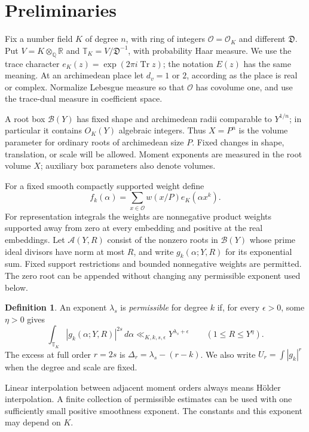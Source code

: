\documentclass[11pt]{amsart}
\theoremstyle{definition}
\newtheorem{definition}[theorem]{Definition}
\numberwithin{equation}{section}
\begin{document}
\section{Preliminaries}
\label{sec:preliminaries}
Fix a number field $K$ of degree $n$, with ring of integers
$\mathcal O=\mathcal O_K$ and different $\mathfrak D$.
Put $V=K\otimes_{\mathbb Q}\mathbb R$ and
$\mathbb T_K=V/\mathfrak D^{-1}$, with probability Haar measure.
We use the trace character $e_K(z)=\exp(2\pi i\operatorname{Tr}z)$;
the notation $E(z)$ has the same meaning. At an archimedean place
let $d_v=1$ or $2$, according as the place is real or complex.
Normalize Lebesgue measure so that $\mathcal O$ has covolume one,
and use the trace-dual measure in coefficient space.

A root box $\mathcal B(Y)$ has fixed shape and archimedean radii
comparable to $Y^{1/n}$; in particular it contains $O_K(Y)$
algebraic integers. Thus $X=P^n$ is the volume parameter for
ordinary roots of archimedean size $P$. Fixed changes in shape,
translation, or scale will be allowed. Moment exponents are measured
in the root volume $X$; auxiliary box parameters also denote volumes.

For a fixed smooth compactly supported weight define
\[
 f_k(\alpha)=\sum_{x\in\mathcal O}w(x/P)e_K(\alpha x^k).
\]
For representation integrals the weights are nonnegative product
weights supported away from zero at every embedding and positive
at the real embeddings. Let $\mathcal A(Y,R)$ consist of the nonzero
roots in $\mathcal B(Y)$ whose prime ideal divisors have norm at most
$R$, and write $g_k(\alpha;Y,R)$ for its exponential sum.
Fixed support restrictions and bounded nonnegative weights are
permitted. The zero root can be appended without changing any
permissible exponent used below.

\begin{definition}
An exponent $\lambda_s$ is \emph{permissible} for degree $k$ if,
for every $\epsilon>0$, some $\eta>0$ gives
\[
 \int_{\mathbb T_K}|g_k(\alpha;Y,R)|^{2s}\,d\alpha
 \ll_{K,k,s,\epsilon}Y^{\lambda_s+\epsilon}
 \qquad(1\le R\le Y^\eta).
\]
The excess at full order $r=2s$ is
$\Delta_r=\lambda_s-(r-k)$. We also write
$U_r=\int|g_k|^r$ when the degree and scale are fixed.
\end{definition}

Linear interpolation between adjacent moment orders always means
H\"older interpolation. A finite collection of permissible estimates
can be used with one sufficiently small positive smoothness exponent.
The constants and this exponent may depend on $K$.
\end{document}
